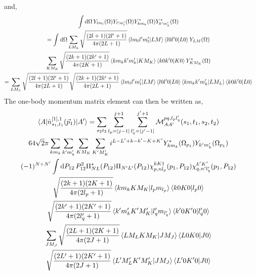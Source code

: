 \documentclass[10pt]{article}
\begin{document}
and,
\begin{multline*}
	\int \text{d} \Omega \, Y_{ l m_l }(\Omega) Y_{ l' m_l'}(\Omega) Y_{ k m_k}^{*}(\Omega) Y_{ k' m_k'}^{*}(\Omega) \\
	= \int \text{d} \Omega \sum_{LM_L} \sqrt{ \frac{(2l+1)(2l'+1)}{4 \pi (2L+1)}} \braket{ l m_l l' m_l' | L M} \braket{ l 0 l' 0 | L 0 } Y_{L M}(\Omega) \\
	 \sum_{K M_K} \sqrt{ \frac{(2k+1)(2k'+1)}{4 \pi (2K+1)}} \braket{ k m_k k' m_k' | K M_K} \braket{ k 0 k' 0 | K 0 } Y_{K M_K}^{*}(\Omega) \\
	 = \sum_{LM_L} \sqrt{ \frac{(2l+1)(2l'+1)}{4 \pi (2L+1)}} \sqrt{ \frac{(2k+1)(2k'+1)}{4 \pi (2L+1)}} \braket{ l m_l l' m_l' | L M} \braket{ l 0 l' 0 | L 0 } \braket{ k m_k k' m_k' | L M_L} \braket{ k 0 k' 0 | L 0 } 
\end{multline*}
The one-body momentum matrix element can then be written as,
\begin{multline*}
\braket{ A | \hat{n}_{s_1,t_1}^{[1],1}(\vec{p}_1) | A'} = \sum_{s_2 t_2}  \sum_{l_p = |j-1|}^{j+1} \sum_{l_q' = |j' - 1|}^{j'+1} \mathcal{M}_{AA'}^{p q,l_p l_q'}(s_1,t_1,s_2,t_2) \\
 64 \sqrt{2} \pi \sum_{k m_k} \sum_{k' m_k'} \sum_{K M_K} \sum_{K' M_K'} i^{L-L'+k-k'-K+K'} Y_{k m_k}^{*}(\Omega_{p_1}) Y_{k' m_k'}(\Omega_{p_1}) \\
(-1)^{N+N'} \int \text{d} P_{12} \, P_{12}^{2} \Pi_{N L}^{*}(P_{12}) \Pi_{N' L'}(P_{12}) \chi_{p,nl_p}^{kK\dagger}(p_1,P_{12}) \chi_{q,n'l_q'}^{k'K'}(p_1,P_{12}) \\
    \sqrt{ \frac{(2 k + 1)(2 K+1)}{4 \pi (2 l_p +1 )}} \braket{ k m_k K M_K | l_p m_{l_p}} \braket{ k 0 K 0 | l_p 0} \\
    \sqrt{ \frac{(2 k' + 1)(2 K'+1)}{4 \pi (2 l_q' +1 )}} \braket{ k' m_k' K' M_K' | l_q' m_{l_q'}} \braket{ k' 0 K' 0 | l_q' 0} \\
    \sum_{J M_J} \sqrt{ \frac{ (2L+1)(2K+1)}{ 4 \pi (2 J+1)} } \braket{ L M_L K M_K | J M_J} \braket{ L 0 K 0 | J 0 } \\ \sqrt{ \frac{ (2L'+1)(2K'+1)}{ 4 \pi (2 J+1)} } \braket{L' M_L' K' M_K' | J M_J } \braket{ L' 0 K' 0 | J 0 } \\ 
\end{multline*}
\end{document}
